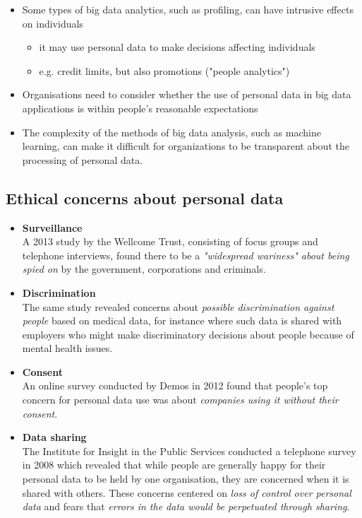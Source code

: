 \documentclass[a4paper]{article}
\begin{document}
		\begin{itemize}
			\item Some types of big data analytics, such as profiling, can have intrusive effects on individuals
				\begin{itemize}
					\item it may use personal data to make decisions affecting individuals
					\item e.g. credit limits, but also promotions ("people analytics")
				\end{itemize}
			\item Organisations need to consider whether the use of personal data in big data applications is within people's reasonable expectations
			\item The complexity of the methods of big data analysis, such as machine learning, can make it difficult for organizations to be transparent about the processing of personal data.
		\end{itemize}
	
		\newpage
	
		\subsection{Ethical concerns about personal data}
		
		\begin{itemize}
			\item \textbf{Surveillance}\\
				A 2013 study by the Wellcome Trust, consisting of focus groups and telephone interviews, found there to be a \textit{"widespread wariness" about being spied on} by the government, corporations and criminals.
			\item \textbf{Discrimination}\\
				The same study revealed concerns about \textit{possible discrimination against people} based on medical data, for instance where such data is shared with employers who might make discriminatory decisions about people because of mental health issues.
			\item \textbf{Consent}\\
				An online survey conducted by Demos in 2012 found that people's top concern for personal data use was about \textit{companies using it without their consent}.
			\item \textbf{Data sharing}\\
				The Institute for Insight in the Public Services conducted a telephone survey in 2008 which revealed that while people are generally happy for their personal data to be held by one organisation, they are concerned when it is shared with others.
				These concerns centered on \textit{loss of control over personal data} and fears that \textit{errors in the data would be perpetuated through sharing}.
		\end{itemize}
	
\end{document}

